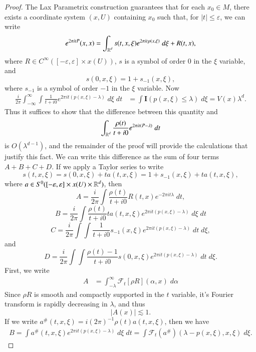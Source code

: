 \begin{proof}
    The Lax Parametrix construction guarantees that for each $x_0 \in M$, there exists a coordinate system $(x,U)$ containing $x_0$ such that, for $|t| \leq \varepsilon$, we can write
    \[ e^{2 \pi i t P}(x,x) = \int_{\operatorname{\mathbb{R}}^d} s(t,x,\xi) e^{2 \pi i t p(x,\xi)}\; d\xi + R(t,x), \]
    where $R \in C^\infty([-\varepsilon,\varepsilon] \times x(U))$, $s$ is a symbol of order 0 in the $\xi$ variable, and
    \[ s(0,x,\xi) = 1 + s_{-1}(x,\xi), \]
    where $s_{-1}$ is a symbol of order $-1$ in the $\xi$ variable. Now
    \begin{align*}
        \frac{i}{2 \pi} \int_{-\infty}^\infty \int \frac{1}{t + i0} e^{2 \pi i t ( p(x,\xi) - \lambda )}\; d\xi\; dt &= \int \mathbf{I}( p(x,\xi) \leq \lambda )\; d\xi = V(x) \lambda^d.
    \end{align*}
    Thus it suffices to show that the difference between this quantity and 
    \[ \int_{\operatorname{\mathbb{R}}^d} \frac{\rho(t)}{t + i0} e^{2 \pi i t (P - \lambda)}\; dt \]
    is $O(\lambda^{d-1})$, and the remainder of the proof will provide the calculations that justify this fact. We can write this difference as the sum of four terms $A + B + C + D$. If we apply a Taylor series to write
    \[ s(t,x,\xi) = s(0,x,\xi) + t a(t,x,\xi) = 1 + s_{-1}(x,\xi) + t a(t,x,\xi), \]
    where $a \in S^0([-\varepsilon,\varepsilon] \times x(U) \times \operatorname{\mathbb{R}}^d)$, then
    \[ A = \frac{i}{2 \pi} \int \frac{\rho(t)}{t + i 0} R(t,x) e^{- 2 \pi i t \lambda}\; dt, \]
    \[ B = \frac{i}{2 \pi} \int \frac{\rho(t)}{t + i 0} t a(t,x,\xi) e^{2 \pi i t (p(x,\xi) - \lambda)}\; d\xi\; dt \]
    \[ C = \frac{i}{2 \pi} \int \int \frac{1}{t + i0} s_{-1}(x,\xi) e^{2 \pi i t ( p(x,\xi) - \lambda )}\; dt\; d\xi, \]
    and
    \[ D = \frac{i}{2 \pi} \int \int \frac{\rho(t) - 1}{t + i0} s(0,x,\xi) e^{2 \pi i t ( p(x,\xi) - \lambda )}\; dt\; d\xi. \]
    First, we write
    \begin{align*}
        A &= \int_{-\lambda}^\infty \mathcal{F}_t[ \rho R ]( \alpha, x )\; d\alpha
    \end{align*}
    Since $\rho R$ is smooth and compactly supported in the $t$ variable, it's Fourier transform is rapidly decreasing in $\lambda$, and thus
    \[ |A(x)| \lesssim 1. \]
    If we write $a^\#(t,x,\xi) = i (2 \pi)^{-1} \rho(t) a(t,x,\xi)$, then we have
    \begin{align*}
        B = \int a^\#(t,x,\xi) e^{2 \pi i t (p(x,\xi) - \lambda)}\; d\xi\; dt = \int \mathcal{F}_t(a^\#)(\lambda - p(x,\xi), x, \xi)\; d\xi.

\end{align*}
\end{proof}
